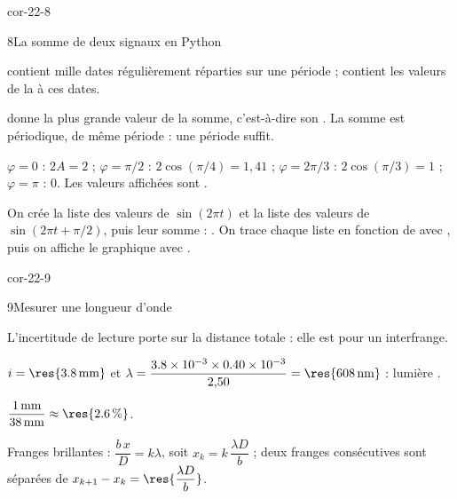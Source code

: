 \begin{blocLivre}{cor-22-8}
\begin{corrige}{8}{La somme de deux signaux en Python}
\begin{questions}
\item {} contient mille dates régulièrement réparties sur une période ;  contient les valeurs
de la  à ces dates.
\item {} donne la plus grande valeur de la somme, c'est-à-dire son . La somme est périodique,
de même période : une période suffit.
\item $\varphi=0$ : $2A=2$ ; $\varphi=\pi/2$ : $2\cos(\pi/4)=1{,}41$ ; $\varphi=2\pi/3$ : $2\cos(\pi/3)=1$ ; $\varphi=\pi$ : 0. Les
valeurs affichées sont .
\item On crée la liste  des valeurs de $\sin(2\pi t)$ et la liste  des valeurs de $\sin(2\pi t+\pi/2)$, puis
leur somme : . On trace chaque liste en fonction de  avec
, puis on affiche le graphique avec .
\end{questions}
\end{corrige}
\end{blocLivre}
\begin{blocLivre}{cor-22-9}
\begin{corrige}{9}{Mesurer une longueur d'onde}
\begin{questions}
\item L'incertitude de lecture porte sur la distance totale : elle est  pour un interfrange.
\item $i=\res{\qty{3,8}{mm}}$ et $\lambda=\dfrac{\num{3.8e-3}\times\num{0.40e-3}}{2{,}50}=\res{\qty{608}{nm}}$ : lumière .
\item $\dfrac{\qty{1}{mm}}{\qty{38}{mm}}\approx\res{\qty{2,6}{\percent}}$.
\item Franges brillantes : $\dfrac{b\,x}{D}=k\lambda$, soit $x_k=k\,\dfrac{\lambda D}{b}$ ; deux franges consécutives sont séparées de
$x_{k+1}-x_k=\res{\dfrac{\lambda D}{b}}$.
\end{questions}
\end{corrige}
\end{blocLivre}
